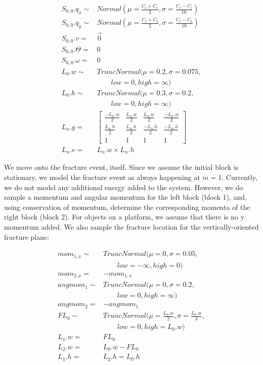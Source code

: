 \documentclass[10pt,twocolumn,letterpaper]{article}
\begin{document}
\begin{align*}
       S_{0,0}.q_x \sim& Normal(\mu=\frac{C_l + C_r}{2},\sigma=\frac{C_r - C_l}{16}) \\
       S_{0,0}.q_y \sim& Normal(\mu=\frac{C_t + C_b}{2},\sigma=\frac{C_t - C_b}{16}) \\
          S_{0,0}.v =& \overrightarrow{0} \\
     S_{0,0}.\Theta =& 0 \\
     S_{0,0}.\omega =& 0 \\
             L_0.w \sim& TruncNormal(\mu=0.2,\sigma=0.075, \\ 
                       & \qquad low=0,high=\infty) \\
             L_0.h \sim& TruncNormal(\mu=0.3,\sigma=0.2, \\ 
                       & \qquad low=0,high=\infty) \\
              L_n.g =& \begin{bmatrix}
                  \frac{-L_n.w}{2} & \frac{L_n.w}{2} &  \frac{L_n.w}{2} & \frac{-L_n.w}{2} \\
                   \frac{L_n.h}{2} & \frac{L_n.h}{2} & \frac{-L_n.h}{2} & \frac{-L_n.h}{2} \\
                                 1 &               1 &                1 &                1
              \end{bmatrix} \\
              L_n.v =& L_n.w \times L_n.h
\end{align*}

We move onto the fracture event, itself. Since we assume the initial block is 
stationary, we model the fracture event as always happening at $m = 1$. Currently, we do 
not model any additional energy added to the system. However, we do sample a 
momentum and angular momentum for the left block (block 1), and, using 
conservation of momentum, determine the corresponding momenta of the right block 
(block 2). For objects on a platform, we assume that there is no y momentum 
added. We also sample the fracture location for the vertically-oriented fracture 
plane:

\begin{align*}
    mom_{1,x} \sim& TruncNormal(\mu=0, \sigma=0.05, \\
                  & \qquad low=-\infty, high=0) \\
     mom_{2,x} =& -mom_{1,x} \\
      angmom_1 \sim& TruncNormal(\mu=0, \sigma=0.2, \\ 
                   & \qquad low=0, high=\infty) \\
      angmom_2 =& -angmom_1 \\
         FL_0 \sim& TruncNormal(\mu=\frac{L_0.w}{2},\sigma=\frac{L_0.w}{4}, \\
                  & \qquad low=0,high=L_0.w) \\
         L_1.w =& FL_0 \\
         L_2.w =& L_0.w - FL_0 \\
         L_1.h =& L_2.h = L_0.h
\end{align*}
\end{document}
